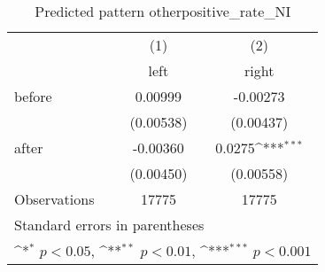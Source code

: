\begin{table}[htbp]\centering
\def\sym#1{\ifmmode^{#1}\else\(^{#1}\)\fi}
\caption{Predicted pattern otherpositive\_rate\_NI}
\begin{tabular}{l*{2}{c}}
\hline\hline
                    &\multicolumn{1}{c}{(1)}&\multicolumn{1}{c}{(2)}\\
                    &\multicolumn{1}{c}{left}&\multicolumn{1}{c}{right}\\
\hline
before              &     0.00999         &    -0.00273         \\
                    &   (0.00538)         &   (0.00437)         \\
[1em]
after               &    -0.00360         &      0.0275\sym{***}\\
                    &   (0.00450)         &   (0.00558)         \\
\hline
Observations        &       17775         &       17775         \\
\hline\hline
\multicolumn{3}{l}{\footnotesize Standard errors in parentheses}\\
\multicolumn{3}{l}{\footnotesize \sym{*} \(p<0.05\), \sym{**} \(p<0.01\), \sym{***} \(p<0.001\)}\\
\end{tabular}
\end{table}
